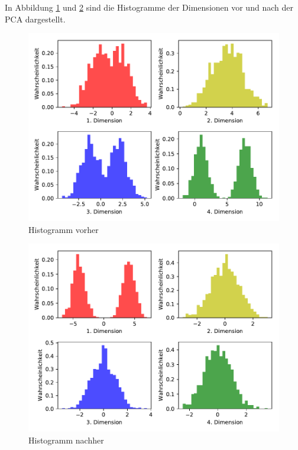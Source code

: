 In Abbildung \ref{abb:3} und \ref{abb:4} sind die Histogramme der Dimensionen
vor und nach der PCA dargestellt.

\begin{figure}
  \centering
  \includegraphics[scale=0.7]{Histogramm_vorher.pdf}
  \caption{Histogramm vorher}
  \label{abb:3}
\end{figure}
\begin{figure}
  \centering
  \includegraphics[scale=0.7]{Histogramm.pdf}
  \caption{Histogramm nachher}
  \label{abb:4}
\end{figure}
